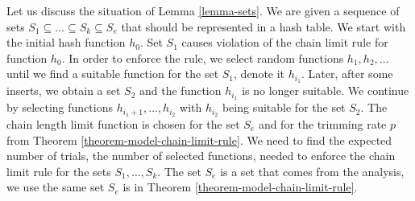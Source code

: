 Let us discuss the situation of Lemma \ref{lemma-sets}. We are given a sequence of sets $S_1 \subseteq \dots \subseteq S_k \subseteq S_e$ that should be represented in a hash table. We start with the initial hash function $h_0$. Set $S_1$ causes violation of the chain limit rule for function $h_0$. In order to enforce the rule, we select random functions $h_1, h_2, \dots$ until we find a suitable function for the set $S_1$, denote it $h_{i_1}$. Later, after some inserts, we obtain a set $S_2$ and the function $h_{i_1}$ is no longer suitable. We continue by selecting functions $h_{i_1 + 1}, \dots, h_{i_2}$ with $h_{i_2}$ being suitable for the set $S_2$. The chain length limit function is chosen for the set $S_e$ and for the trimming rate $p$ from Theorem \ref{theorem-model-chain-limit-rule}. We need to find the expected number of trials, the number of selected functions, needed to enforce the chain limit rule for the sets $S_1, \dots, S_k$. The set $S_e$ is a set that comes from the analysis, we use the same set $S_e$ is in Theorem \ref{theorem-model-chain-limit-rule}.

